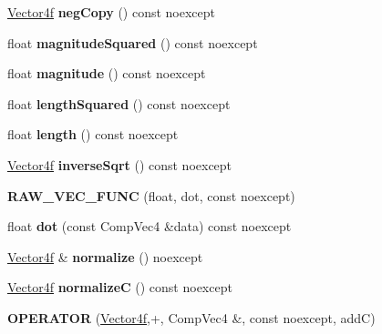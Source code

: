\begin{DoxyCompactItemize}
\mbox{\label{class_vector4f_a2a5e783b08fcf22ecee68ddfcc53ac5b}} 
\mbox{\hyperlink{class_vector4f}{Vector4f}} {\bfseries neg\+Copy} () const noexcept
\item 
\mbox{\label{class_vector4f_a4641d3c86a1366eb5f6b3c880fb1388c}} 
float {\bfseries magnitude\+Squared} () const noexcept
\item 
\mbox{\label{class_vector4f_ae5a353ffdc7ac6dd265d16fe82763973}} 
float {\bfseries magnitude} () const noexcept
\item 
\mbox{\label{class_vector4f_acd79a3aeba2b88223840e3d6e35dde25}} 
float {\bfseries length\+Squared} () const noexcept
\item 
\mbox{\label{class_vector4f_a8aaa137a5bd59c15a7e0e3ffd72d019b}} 
float {\bfseries length} () const noexcept
\item 
\mbox{\label{class_vector4f_afbb9602ab38f270eaa59311f926755f7}} 
\mbox{\hyperlink{class_vector4f}{Vector4f}} {\bfseries inverse\+Sqrt} () const noexcept
\item 
\mbox{\label{class_vector4f_aeb2ea3938f4cb8aa8997f32facc39179}} 
{\bfseries R\+A\+W\+\_\+\+V\+E\+C\+\_\+\+F\+U\+NC} (float, dot, const noexcept)
\item 
\mbox{\label{class_vector4f_afee444a369e2915b54bbd6248fefe509}} 
float {\bfseries dot} (const Comp\+Vec4 \&data) const noexcept
\item 
\mbox{\label{class_vector4f_a42a50218a9a59b572cf01a591f0342c8}} 
\mbox{\hyperlink{class_vector4f}{Vector4f}} \& {\bfseries normalize} () noexcept
\item 
\mbox{\label{class_vector4f_a454605f4fc0616c63557a3ae244bca53}} 
\mbox{\hyperlink{class_vector4f}{Vector4f}} {\bfseries normalizeC} () const noexcept
\item 
\mbox{\label{class_vector4f_adfc9296b167d98e83902e6df86bd2ee7}} 
{\bfseries O\+P\+E\+R\+A\+T\+OR} (\mbox{\hyperlink{class_vector4f}{Vector4f}},+, Comp\+Vec4 \&, const noexcept, addC)

\end{DoxyCompactItemize}
